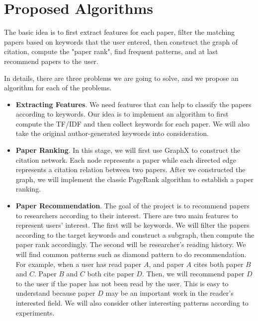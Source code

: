\section{Proposed Algorithms}

The basic idea is to first extract features for each paper, filter the matching papers based on keywords that the user entered, then construct the graph of citation, compute the "paper rank", find frequent patterns, and at last recommend papers to the user.

In details, there are three problems we are going to solve, and we propose an algorithm for each of the problems.

\begin{itemize}
	\item \textbf{Extracting Features}. We need features that can help to classify the papers according to keywords. Our idea is to implement an algorithm to first compute the TF/IDF and then collect keywords for each paper. We will also take the original author-generated keywords into consideration.
	\item \textbf{Paper Ranking}. In this stage, we will first use GraphX to construct the citation network. Each node represents a paper while each directed edge represents a citation relation between two papers. After we constructed the graph, we will implement the classic PageRank algorithm to establish a paper ranking. 
	\item \textbf{Paper Recommendation}. The goal of the project is to recommend papers to researchers according to their interest. There are two main features to represent users' interest. The first will be keywords. We will filter the papers according to the target keywords and construct a subgraph, then compute the paper rank accordingly. The second will be researcher's reading history. We will find common patterns such as diamond pattern to do recommendation. For example, when a user has read paper $A$, and paper $A$ cites both paper $B$ and $C$. Paper $B$ and $C$ both cite paper $D$. Then, we will recommend paper $D$ to the user if the paper has not been read by the user. This is easy to understand because paper $D$ may be an important work in the reader's interested field. We will also consider other interesting patterns according to experiments.
\end{itemize}
